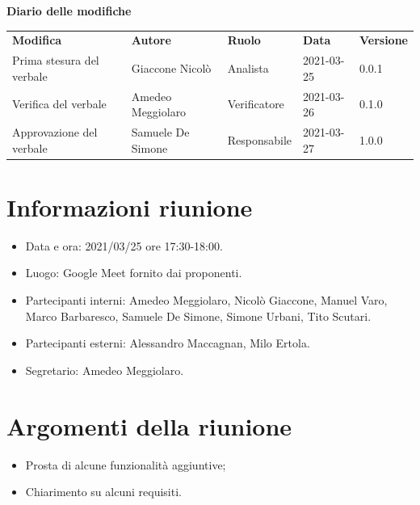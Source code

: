\documentclass[a4paper]{article}
\begin{document}
    \begin{center}
        \textbf{\Large Diario delle modifiche}\\
        \vspace{10px}
        \begin{table}[h!]
        \centering
        \renewcommand{\arraystretch}{1.8}
        \begin{tabular}{p{150px} p{90px} p{50px} p{60px} p{45px}}
            \rowcolor{logo!70} \textbf{Modifica} & \textbf{Autore} & \textbf{Ruolo} & \textbf{Data} & \textbf{Versione}\\
            Prima stesura del verbale & Giaccone Nicolò & Analista & 2021-03-25 & 0.0.1 \\    
            Verifica del verbale & Amedeo Meggiolaro & Verificatore & 2021-03-26 & 0.1.0 \\    
            Approvazione del verbale & Samuele De Simone & Responsabile & 2021-03-27 & 1.0.0 \\    
        \end{tabular}
    \end{table}
    \end{center}

    \newpage
    \tableofcontents
    \newpage
    \section{Informazioni riunione}
    \begin{itemize}
        \item Data e ora: 2021/03/25 ore 17:30-18:00.
        \item Luogo: Google Meet fornito dai proponenti.
        \item Partecipanti interni: Amedeo Meggiolaro, Nicolò Giaccone, Manuel Varo, Marco Barbaresco, Samuele De Simone, Simone Urbani, Tito Scutari.
        \item Partecipanti esterni: Alessandro Maccagnan, Milo Ertola.
        \item Segretario: Amedeo Meggiolaro.
    \end{itemize}
    \section{Argomenti della riunione}
    \begin{itemize}
        \item Prosta di alcune funzionalità aggiuntive;
        \item Chiarimento su alcuni requisiti.
    \end{itemize}
\end{document}
